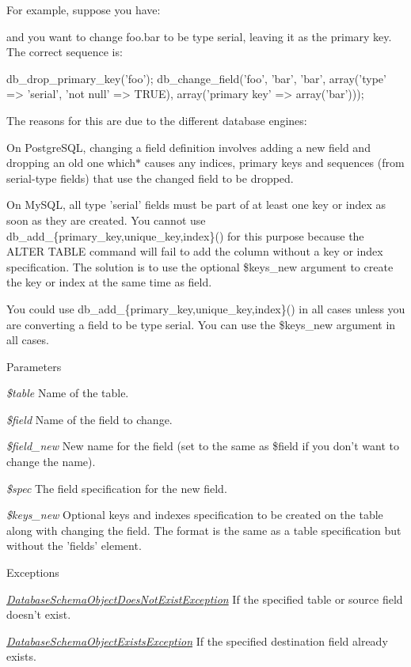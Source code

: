 For example, suppose you have: 
 and you want to change foo.bar to be type serial, leaving it as the primary key. The correct sequence is: 
\begin{DoxyCode}
 db_drop_primary_key('foo');
 db_change_field('foo', 'bar', 'bar',
   array('type' => 'serial', 'not null' => TRUE),
   array('primary key' => array('bar')));
\end{DoxyCode}


The reasons for this are due to the different database engines:

On PostgreSQL, changing a field definition involves adding a new field and dropping an old one which$\ast$ causes any indices, primary keys and sequences (from serial-\/type fields) that use the changed field to be dropped.

On MySQL, all type 'serial' fields must be part of at least one key or index as soon as they are created. You cannot use db\_\-add\_\-\{primary\_\-key,unique\_\-key,index\}() for this purpose because the ALTER TABLE command will fail to add the column without a key or index specification. The solution is to use the optional \$keys\_\-new argument to create the key or index at the same time as field.

You could use db\_\-add\_\-\{primary\_\-key,unique\_\-key,index\}() in all cases unless you are converting a field to be type serial. You can use the \$keys\_\-new argument in all cases.


\begin{DoxyParams}{Parameters}
\item[{\em \$table}]Name of the table. \item[{\em \$field}]Name of the field to change. \item[{\em \$field\_\-new}]New name for the field (set to the same as \$field if you don't want to change the name). \item[{\em \$spec}]The field specification for the new field. \item[{\em \$keys\_\-new}]Optional keys and indexes specification to be created on the table along with changing the field. The format is the same as a table specification but without the 'fields' element.\end{DoxyParams}

\begin{DoxyExceptions}{Exceptions}
\item[{\em \hyperlink{classDatabaseSchemaObjectDoesNotExistException}{DatabaseSchemaObjectDoesNotExistException}}]If the specified table or source field doesn't exist. \item[{\em \hyperlink{classDatabaseSchemaObjectExistsException}{DatabaseSchemaObjectExistsException}}]If the specified destination field already exists. \end{DoxyExceptions}


